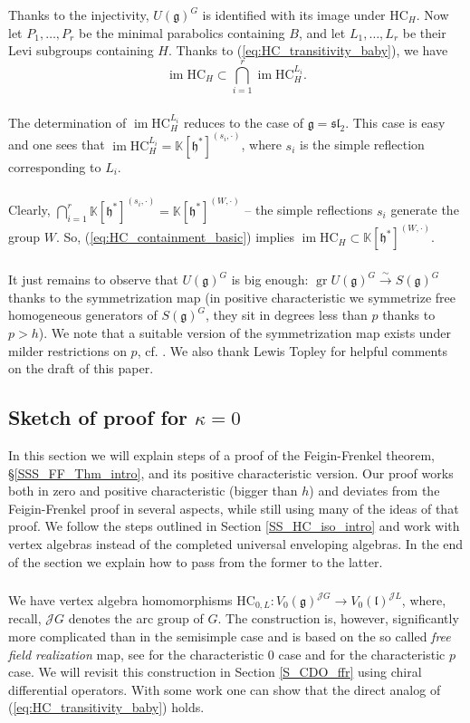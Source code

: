 \documentclass{amsart}
\theoremstyle{definition}
\newcommand{\sss}{\subsubsection{}}
\newcommand{\g}{\mathfrak{g}}
\newcommand{\gr}{\operatorname{gr}}
\newcommand{\h}{\mathfrak{h}}
\newcommand{\HC}{\mathrm{HC}} %
\newcommand{\lf}{\mathfrak{l}}
\newcommand{\Jet}{\mathscr{J}}
\newcommand{\bK}{\mathbb{K}}
\renewcommand{\bK}{\mathbb{K}} %
\numberwithin{equation}{section}
\begin{document}
Thanks to the injectivity,
$U(\g)^G$ is identified with its image under $\HC_H$. Now let $P_1,\ldots, P_r$ be the minimal parabolics containing  $B$, and let $L_1,\ldots,L_r$ be their Levi subgroups containing  $H$. Thanks to  
(\ref{eq:HC_transitivity_baby}), we have 
\begin{equation}\label{eq:HC_containment_basic}
\operatorname{im}\HC_H\subset \bigcap_{i=1}^r \operatorname{im}\HC^{L_i}_{H}.
\end{equation}

\sss\label{SSS_HC_sl2}
The determination of $\operatorname{im}\HC^{L_i}_{H}$ reduces to the case of $\g=\mathfrak{sl}_2$. This case is easy and one sees that 
$\operatorname{im}\HC^{L_i}_H=\bK[\h^*]^{(s_i,\cdot)}$, where $s_i$
is the simple reflection corresponding to $L_i$.

\sss\label{SSS_HC_intersection_baby}
Clearly, $\bigcap_{i=1}^r \bK[\h^*]^{(s_i,\cdot)}=\bK[\h^*]^{(W,\cdot)}$ -- the simple reflections $s_i$ generate the group $W$. So, 
(\ref{eq:HC_containment_basic}) implies $\operatorname{im}\HC_H\subset \bK[\h^*]^{(W,\cdot)}$.

\sss\label{SSS_HC_big_baby}
It just remains to observe that $U(\g)^G$ is big enough: 
$\gr U(\g)^G\xrightarrow{\sim} S(\g)^G$ thanks to the symmetrization map (in positive characteristic we symmetrize free homogeneous generators of $S(\g)^G$, they sit in degrees less than $p$
thanks to  $p>h$). We note that a suitable version of the symmetrization map exists under milder restrictions on $p$, cf. \cite{Friedlander_Parshall}. We also thank Lewis Topley for helpful comments on the draft of this paper.


\subsection{Sketch of proof for $\kappa=0$}
In this section we will explain steps of a proof of the Feigin-Frenkel theorem, \S\ref{SSS_FF_Thm_intro}, and its positive characteristic version. Our proof works both in zero and positive characteristic (bigger than $h$) and deviates from the Feigin-Frenkel proof 
in several aspects, while still using many of the ideas of that proof. We follow the steps outlined in Section 
\ref{SS_HC_iso_intro} and work with vertex algebras instead of the completed universal enveloping algebras.
In the end of the section we explain how to pass from the former to the latter.

\sss\label{SSS_HC_vertex} We have vertex algebra homomorphisms
$\HC_{0,L}:V_0(\g)^{\Jet G}\rightarrow V_0(\lf)^{\Jet L}$, where, recall, $\Jet G$ denotes the arc group of $G$. The construction is, however, significantly more complicated than in the semisimple case and is based on the so called {\it free field realization} map, see 
\cite[Section 5]{Frenkel_loop} for the characteristic $0$ case and \cite{AW} for the characteristic $p$ case. We will revisit this construction in Section \ref{S_CDO_ffr} using chiral differential operators.
With some work one can show that the direct analog of 
(\ref{eq:HC_transitivity_baby}) holds. 
\end{document}
